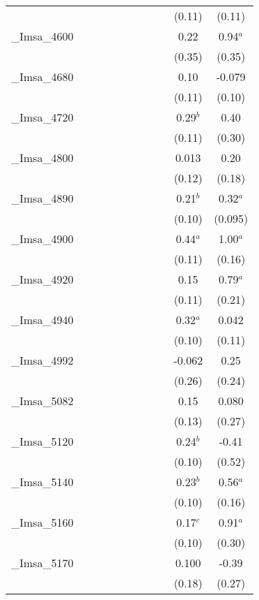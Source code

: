 \documentclass[]{article}
\begin{document}
\begin{tabular}{lcccccccccc}
 &  &  &  &  &  &  &  &  & (0.11) & (0.11) \\
\_Imsa\_4600 &  &  &  &  &  &  &  &  & 0.22 & 0.94$^a$ \\
 &  &  &  &  &  &  &  &  & (0.35) & (0.35) \\
\_Imsa\_4680 &  &  &  &  &  &  &  &  & 0.10 & -0.079 \\
 &  &  &  &  &  &  &  &  & (0.11) & (0.10) \\
\_Imsa\_4720 &  &  &  &  &  &  &  &  & 0.29$^b$ & 0.40 \\
 &  &  &  &  &  &  &  &  & (0.11) & (0.30) \\
\_Imsa\_4800 &  &  &  &  &  &  &  &  & 0.013 & 0.20 \\
 &  &  &  &  &  &  &  &  & (0.12) & (0.18) \\
\_Imsa\_4890 &  &  &  &  &  &  &  &  & 0.21$^b$ & 0.32$^a$ \\
 &  &  &  &  &  &  &  &  & (0.10) & (0.095) \\
\_Imsa\_4900 &  &  &  &  &  &  &  &  & 0.44$^a$ & 1.00$^a$ \\
 &  &  &  &  &  &  &  &  & (0.11) & (0.16) \\
\_Imsa\_4920 &  &  &  &  &  &  &  &  & 0.15 & 0.79$^a$ \\
 &  &  &  &  &  &  &  &  & (0.11) & (0.21) \\
\_Imsa\_4940 &  &  &  &  &  &  &  &  & 0.32$^a$ & 0.042 \\
 &  &  &  &  &  &  &  &  & (0.10) & (0.11) \\
\_Imsa\_4992 &  &  &  &  &  &  &  &  & -0.062 & 0.25 \\
 &  &  &  &  &  &  &  &  & (0.26) & (0.24) \\
\_Imsa\_5082 &  &  &  &  &  &  &  &  & 0.15 & 0.080 \\
 &  &  &  &  &  &  &  &  & (0.13) & (0.27) \\
\_Imsa\_5120 &  &  &  &  &  &  &  &  & 0.24$^b$ & -0.41 \\
 &  &  &  &  &  &  &  &  & (0.10) & (0.52) \\
\_Imsa\_5140 &  &  &  &  &  &  &  &  & 0.23$^b$ & 0.56$^a$ \\
 &  &  &  &  &  &  &  &  & (0.10) & (0.16) \\
\_Imsa\_5160 &  &  &  &  &  &  &  &  & 0.17$^c$ & 0.91$^a$ \\
 &  &  &  &  &  &  &  &  & (0.10) & (0.30) \\
\_Imsa\_5170 &  &  &  &  &  &  &  &  & 0.100 & -0.39 \\
 &  &  &  &  &  &  &  &  & (0.18) & (0.27) \\

\end{tabular}
\end{document}
